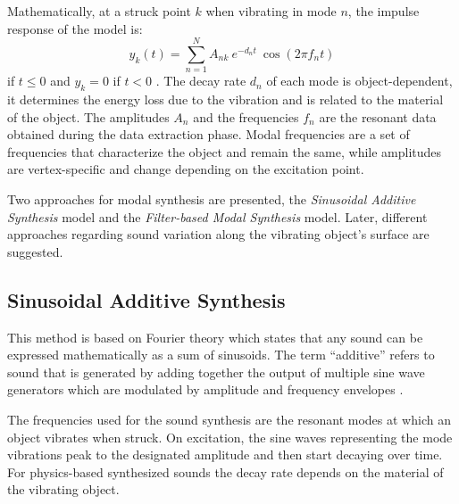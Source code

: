 
Mathematically, at a struck point $k$ when vibrating in mode $n$, the impulse response of the model is:
\begin{equation}\label{eq:modal_response}
y_k(t) = \sum\limits_{n=1}^{N} A_{nk}\ e^{-d_n t}\ \cos(2 \pi f_nt)
\end{equation}
if $t\leqslant 0$ and $y_k = 0$ if $t<0$ \cite{van2001foleyautomatic}. The decay rate $d_n$ of each mode is object-dependent, it determines the energy loss due to the vibration and is related to the material of the object. The amplitudes $A_n$ and the frequencies $f_n$ are the resonant data obtained during the data extraction phase. Modal frequencies are a set of frequencies that characterize the object and remain the same, while amplitudes are vertex-specific and change depending on the excitation point.

Two approaches for modal synthesis are presented, the \textit{Sinusoidal Additive Synthesis} model and the \textit{Filter-based Modal Synthesis} model. Later, different approaches regarding sound variation along the vibrating object's surface are suggested.

\subsection{Sinusoidal Additive Synthesis}\label{sec:sin_synth}

This method is based on Fourier theory which states that any sound can be expressed mathematically as a sum of sinusoids. The term ``additive'' refers to sound that is generated by adding together the output of multiple sine wave generators which are modulated by amplitude and frequency envelopes \cite{smith2011spectral}.

The frequencies used for the sound synthesis are the resonant modes at which an object vibrates when struck. On excitation, the sine waves representing the mode vibrations peak to the designated amplitude and then start decaying over time. For physics-based synthesized sounds the decay rate depends on the material of the vibrating object.%

